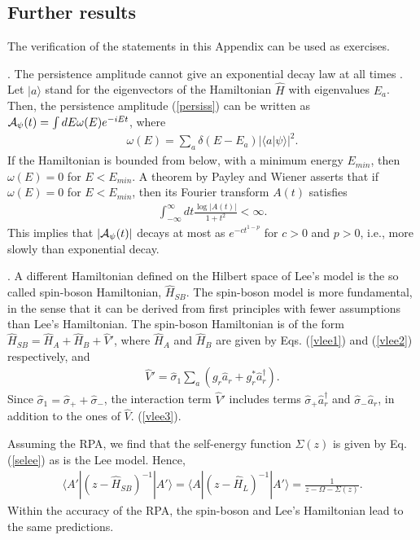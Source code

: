 \documentclass[12pt]{article}
\numberwithin{equation}{section}
\begin{document}
\begin{appendix}
\section{Further results}
The verification of the statements in this Appendix can be used as exercises.

\bigskip

. The persistence amplitude cannot give an exponential decay law at all times \cite{Khalfin}. Let $|a\rangle$ stand for the eigenvectors of the Hamiltonian $\hat{H}$ with eigenvalues $E_a$. Then, the persistence amplitude (\ref{persiss}) can be written as ${\cal A}_{\psi}(t) = \int dE \omega(E)e^{-iEt}$, where
\begin{eqnarray}
\omega(E) = \sum_a \delta(E-E_a) |\langle a|\psi\rangle|^2.
\end{eqnarray}
If the Hamiltonian is bounded from below, with a minimum energy $E_{min}$, then $\omega(E) = 0 $ for $E < E_{min}$. A theorem by Payley and Wiener  \cite{PaWi} asserts that if $\omega(E) = 0 $ for $E < E_{min}$, then its
Fourier transform $A(t)$  satisfies
\begin{eqnarray}
\int_{-\infty}^{\infty} dt \frac{ \log|A(t)|}{1+t^2} < \infty.
\end{eqnarray}
 This implies that $|{\cal A}_{\psi}(t)|$ decays at most  as $e^{-c t^{1 - p}}$ for $c > 0$ and $p >0$, i.e., more slowly than exponential decay.

 \bigskip

.
 A different Hamiltonian defined on the  Hilbert space of Lee's model is the so called spin-boson Hamiltonian, $\hat{H}_{SB}$. The spin-boson model \cite{spbo} is more fundamental, in the sense that it can be derived from first principles with fewer assumptions than Lee's Hamiltonian. The spin-boson Hamiltonian is of the form
  $\hat{H}_{SB} = \hat{H}_A + \hat{H}_B + \hat{V}'$, where $\hat{H}_A$ and $\hat{H}_B$ are given by Eqs. (\ref{vlee1}) and (\ref{vlee2}) respectively, and
\begin{eqnarray}
\hat{V}' =  \hat{\sigma}_1  \sum_a \left(g_r     \hat{a}_r + g_r^*   \hat{a}_r^{\dagger} \right). \label{vsb}
\end{eqnarray}
Since $\hat{\sigma}_1 = \hat{\sigma}_+ + \hat{\sigma}_-$, the interaction term $\hat{V}'$ includes terms  $\hat{\sigma}_+  \hat{a}^{\dagger}_r$ and $\hat{\sigma}_-   \hat{a}_r$, in addition to the ones of  $\hat{V}$. (\ref{vlee3}).

Assuming the RPA, we find that the self-energy function  $\Sigma(z)$ is given by Eq. (\ref{selee}) as is the Lee model. Hence,
\begin{eqnarray}
\langle A' |(z -\hat{H}_{SB})^{-1}|A'\rangle  = \langle A |(z -\hat{H}_L)^{-1}|A'\rangle =   \frac{1}{z - \Omega - \Sigma(z)}.
\end{eqnarray}
 Within the accuracy of the RPA, the spin-boson and Lee's Hamiltonian lead to the same predictions.


\end{appendix}
\end{document}
